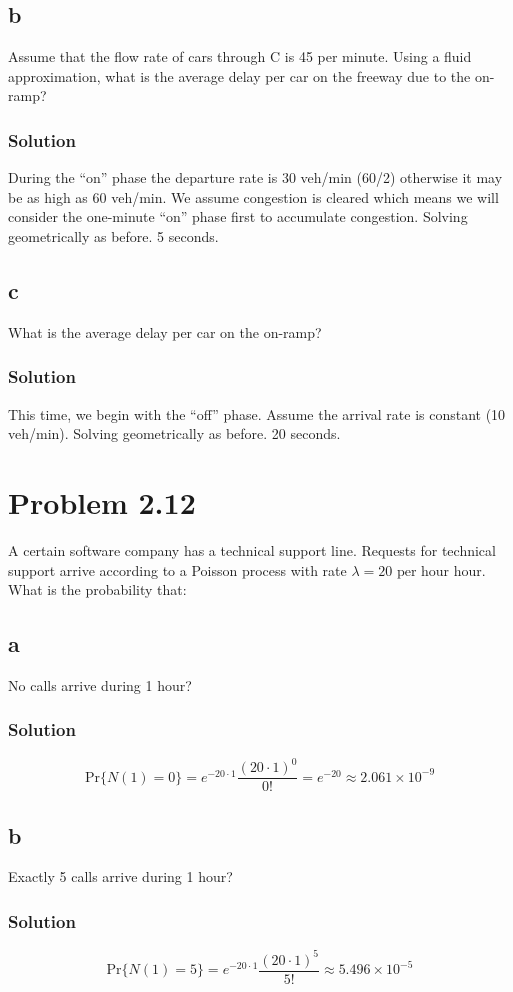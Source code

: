 \documentclass[letterpaper]{amsart}
\begin{document}
\subsection*{b}
Assume that the flow rate of cars through C is 45 per minute. Using a
fluid approximation, what is the average delay per car on the freeway
due to the on-ramp?
\subsubsection*{Solution}
During the ``on'' phase the departure rate is 30 veh/min (60/2) otherwise it may
be as high as 60 veh/min. We assume congestion is cleared which means we will
consider the one-minute ``on'' phase first to accumulate congestion.
Solving geometrically as before. 5 seconds.
\subsection*{c}
What is the average delay per car on the on-ramp?
\subsubsection*{Solution}
This time, we begin with the ``off'' phase.
Assume the arrival rate is constant (10 veh/min).
Solving geometrically as before. 20 seconds.


\section{Problem 2.12} %
A certain software company has a technical support line. Requests for
technical support arrive according to a Poisson process with rate
$\lambda=20\text{ per hour}$ hour. What is the probability that:
\subsection*{a}
No calls arrive during 1 hour?
\subsubsection*{Solution}
\begin{equation*}
  \text{Pr}\{N(1)=0\}=e^{-20\cdot 1}\frac{(20\cdot 1)^0}{0!} =e^{-20}
  \approx 2.061\times 10^{-9}
\end{equation*}
\subsection*{b}
Exactly 5 calls arrive during 1 hour?
\subsubsection*{Solution}
\begin{equation*}
\text{Pr}\{N(1)=5\}=e^{-20\cdot 1}\frac{(20\cdot 1)^5}{5!}\approx 5.496\times 10^{-5}
\end{equation*}
\end{document}
